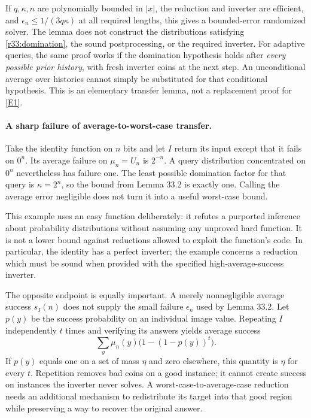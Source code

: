\documentclass[11pt]{article}
\begin{document}
If $q,\kappa,n$ are polynomially bounded in $|x|$, the reduction and inverter
are efficient, and $\epsilon_n\le1/(3q\kappa)$ at all required lengths,
this gives a bounded-error randomized solver. The lemma does not construct
the distributions satisfying \eqref{r33:domination}, the sound postprocessing,
or the required inverter. For adaptive queries, the same proof works if
the domination hypothesis holds after \emph{every possible prior history},
with fresh inverter coins at the next step. An unconditional average over
histories cannot simply be substituted for that conditional hypothesis.
This is an elementary transfer lemma, not a replacement proof for \href{https://people.csail.mit.edu/akavia/2006-stocAGGM.pdf}{[E1]}.

\paragraph{A sharp failure of average-to-worst-case transfer.}
Take the identity function on $n$ bits and let $I$ return its input except
that it fails on $0^n$. Its average failure on $\mu_n=U_n$ is $2^{-n}$.
A query distribution concentrated on $0^n$ nevertheless has failure one.
The least possible domination factor for that query is $\kappa=2^n$,
so the bound from Lemma 33.2 is exactly one. Calling the average error
negligible does not turn it into a useful worst-case bound.

This example uses an easy function deliberately: it refutes a purported
inference about probability distributions without assuming any unproved
hard function. It is not a lower bound against reductions allowed to
exploit the function's code. In particular, the identity has a perfect
inverter; the example concerns a reduction which must be sound when
provided with the specified high-average-success inverter.

The opposite endpoint is equally important. A merely nonnegligible
average success $s_I(n)$ does not supply the small failure
$\epsilon_n$ used by Lemma 33.2. Let $p(y)$ be the success probability
on an individual image value. Repeating $I$ independently $t$ times and
verifying its answers yields average success
\begin{equation}\label{r33:repetition}
       \sum_y\mu_n(y)\bigl(1-(1-p(y))^t\bigr).
\end{equation}
If $p(y)$ equals one on a set of mass $\eta$ and zero elsewhere, this
quantity is $\eta$ for every $t$. Repetition removes bad coins on a good
instance; it cannot create success on instances the inverter never solves.
A worst-case-to-average-case reduction needs an additional mechanism to
redistribute its target into that good region while preserving a way to
recover the original answer.
\end{document}
